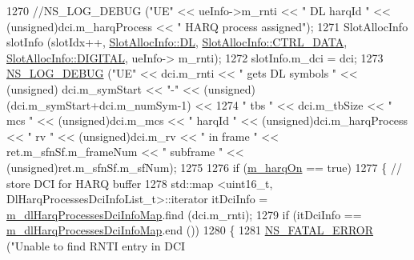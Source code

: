 \begin{DoxyCode}
1270                         \textcolor{comment}{//NS\_LOG\_DEBUG ("UE" << ueInfo->m\_rnti << " DL harqId " <<
       (unsigned)dci.m\_harqProcess << " HARQ process assigned");}
1271                         SlotAllocInfo slotInfo (slotIdx++, \hyperlink{structns3_1_1SlotAllocInfo_a6cad60db1d39034f1851e2cea625fe5da9a365c9c56b7c32dcae38ee1a468ce6d}{SlotAllocInfo::DL}, 
      \hyperlink{structns3_1_1SlotAllocInfo_a3ea7cb503bfd0c9a4df55a71b81b9331a1ea636c3f068558fabacbc39934309b8}{SlotAllocInfo::CTRL\_DATA}, \hyperlink{structns3_1_1SlotAllocInfo_adcbd067d82be6260b3399167d8f0b4eca47a67c342db658a08ded9ce4b49417ea}{SlotAllocInfo::DIGITAL}, ueInfo->
      m\_rnti);
1272                         slotInfo.m\_dci = dci;
1273                         \hyperlink{group__logging_ga413f1886406d49f59a6a0a89b77b4d0a}{NS\_LOG\_DEBUG} (\textcolor{stringliteral}{"UE"} << dci.m\_rnti << \textcolor{stringliteral}{" gets DL symbols "} << (\textcolor{keywordtype}{unsigned})
      dci.m\_symStart << \textcolor{stringliteral}{"-"} << (\textcolor{keywordtype}{unsigned})(dci.m\_symStart+dci.m\_numSym-1) <<
1274                                                                                 \textcolor{stringliteral}{" tbs "} << dci.m\_tbSize << \textcolor{stringliteral}{
      " mcs "} << (\textcolor{keywordtype}{unsigned})dci.m\_mcs << \textcolor{stringliteral}{" harqId "} << (\textcolor{keywordtype}{unsigned})dci.m\_harqProcess << \textcolor{stringliteral}{" rv "} << (\textcolor{keywordtype}{unsigned})dci.m\_rv 
      << \textcolor{stringliteral}{" in frame "} << ret.m\_sfnSf.m\_frameNum << \textcolor{stringliteral}{" subframe "} << (\textcolor{keywordtype}{unsigned})ret.m\_sfnSf.m\_sfNum);
1275 
1276                         \textcolor{keywordflow}{if} (\hyperlink{classns3_1_1MmWaveFlexTtiMaxRateMacScheduler_a43dee0cca8dce652c2a2dc750262708e}{m\_harqOn} == \textcolor{keyword}{true})
1277                         \{       \textcolor{comment}{// store DCI for HARQ buffer}
1278                                 std::map <uint16\_t, DlHarqProcessesDciInfoList\_t>::iterator itDciInfo = 
      \hyperlink{classns3_1_1MmWaveFlexTtiMaxRateMacScheduler_a1595e5398c1750599918db31324a3d68}{m\_dlHarqProcessesDciInfoMap}.find (dci.m\_rnti);
1279                                 \textcolor{keywordflow}{if} (itDciInfo == \hyperlink{classns3_1_1MmWaveFlexTtiMaxRateMacScheduler_a1595e5398c1750599918db31324a3d68}{m\_dlHarqProcessesDciInfoMap}.end
       ())
1280                                 \{
1281                                         \hyperlink{group__fatal_ga5131d5e3f75d7d4cbfd706ac456fdc85}{NS\_FATAL\_ERROR} (\textcolor{stringliteral}{"Unable to find RNTI entry in DCI
}
\end{DoxyCode}
